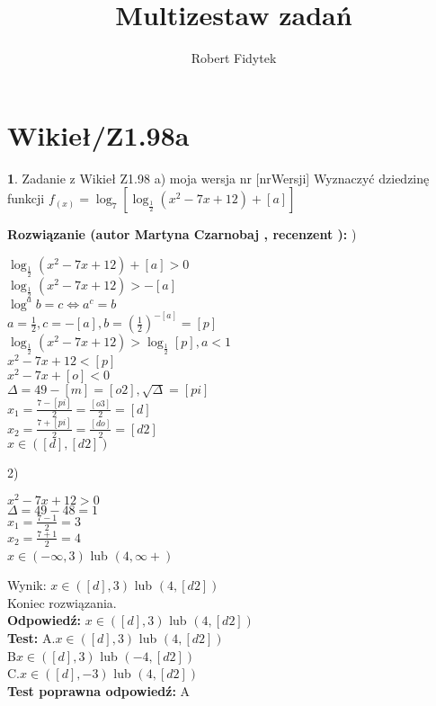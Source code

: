 \documentclass[12pt, a4paper]{article}
\title{Multizestaw zadań}
\author{Robert Fidytek}
\date{}
\theoremstyle{definition} %
\newtheorem{zad}{}
\newcommand{\kategoria}[1]{\section{#1}} %
\newcommand{\zadStart}[1]{\begin{zad}#1\newline} %
\newcommand{\zadStop}{\end{zad}}   %
\newcommand{\rozwStart}[2]{\noindent \textbf{Rozwiązanie (autor #1 , recenzent #2): }\newline} %
\newcommand{\rozwStop}{\newline}                                            %
\newcommand{\odpStart}{\noindent \textbf{Odpowiedź:}\newline}    %
\newcommand{\odpStop}{\newline}                                             %
\newcommand{\testStart}{\noindent \textbf{Test:}\newline} %
\newcommand{\testStop}{\newline} %
\newcommand{\kluczStart}{\noindent \textbf{Test poprawna odpowiedź:}\newline} %
\newcommand{\kluczStop}{\newline} %
\begin{document}
\maketitle


\kategoria{Wikieł/Z1.98a}
\zadStart{Zadanie z Wikieł Z1.98 a) moja wersja nr [nrWersji]}
Wyznaczyć dziedzinę funkcji $ f_{(x)} = \log_{7}[\log_{\frac{1}{2}} (x^{2} - 7x + 12) + [a]] $\\
\zadStop
\rozwStart{Martyna Czarnobaj}{}
1)
\begin{center}
	$ \log_{\frac{1}{2}} (x^{2} - 7x + 12) + [a] > 0 $\\
	$ \log_{\frac{1}{2}} (x^{2} - 7x + 12) > -[a] $\\
	$ \log^{a} b = c \Leftrightarrow a^{c} = b $\\
	$ a = \frac{1}{2}, c = -[a], b = (\frac{1}{2})^{-[a]} = [p] $\\
	$ \log_{\frac{1}{2}} (x^{2} - 7x + 12) > \log_{\frac{1}{2}} [p], a < 1 $\\
	$ x^{2} - 7x + 12 < [p] $\\
	$ x^{2} - 7x + [o] < 0 $\\
	$ \Delta = 49 - [m] = [o2], \sqrt{\Delta}=[pi] $\\
	$ x_{1} = \frac{7 - [pi]}{2} = \frac{[o3]}{2} = [d] $\\
	$ x_{2} = \frac{7 + [pi]}{2} = \frac{[do]}{2} = [d2]  $\\
	$ x \in ([d],[d2]) $\\
\end{center}
2)
\begin{center}
	$ x^{2} - 7x + 12 > 0 $\\
	$ \Delta = 49 - 48 = 1 $\\
	$ x_{1} = \frac{7 - 1}{2} = 3 $\\
	$ x_{2} = \frac{7 + 1}{2} = 4 $\\
	$ x \in (- \infty, 3) $ lub $ (4, \infty +) $\\
	
\end{center}
Wynik: $ x \in ([d],3) $ lub $ (4,[d2]) $\\
Koniec rozwiązania.\\
\rozwStop
\odpStart
$ x \in ([d],3) $ lub $ (4,[d2]) $\\
\odpStop
\testStart
A.$ x \in ([d],3) $ lub $ (4,[d2]) $\\
B$ x \in ([d],3) $ lub $ (-4,[d2]) $\\
C.$ x \in ([d],-3) $ lub $ (4,[d2]) $\\
\testStop
\kluczStart
A
\kluczStop
\end{document}

